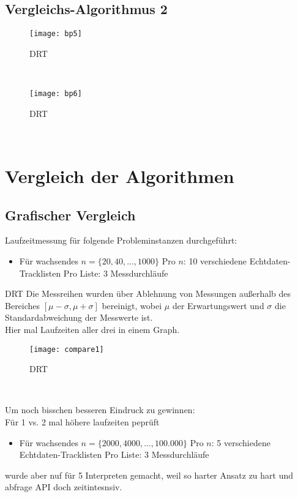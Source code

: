 \documentclass[
10pt, %
a4paper, %
oneside, %
headinclude,footinclude, %
BCOR5mm, %
]{scrartcl}
\begin{document}
\subsection{Vergleichs-Algorithmus 2}


\begin{figure}[h!]
	\centering 
	\texttt{[image: bp5]} 
	\caption[DRT]{DRT}
\end{figure}\
\begin{figure}[h!]
	\centering 
	\texttt{[image: bp6]} 
	\caption[DRT]{DRT}
\end{figure}\

\section{Vergleich der Algorithmen}
\subsection{Grafischer Vergleich}

Laufzeitmessung für folgende Probleminstanzen durchgeführt:
\begin{itemize}[noitemsep]
	\item Für wachsendes  \(n = \{20,40,...,1000\}\)
	\subitem Pro \(n\): 10 verschiedene Echtdaten-Tracklisten
	\subsubitem Pro Liste: 3 Messdurchläufe
\end{itemize}

DRT
Die Messreihen wurden über Ablehnung von Messungen außerhalb des Bereiches \([\mu-\sigma,\mu+\sigma]\) bereinigt, wobei \(\mu\) der Erwartungswert und \(\sigma\) die Standardabweichung der Messwerte ist.\\

Hier mal Laufzeiten aller drei in einem Graph.
\begin{figure}[h!]
	\centering 
	\texttt{[image: compare1]} 
	\caption[DRT]{DRT}
\end{figure}\


Um noch bisschen besseren Eindruck zu gewinnen:\\
Für 1 vs. 2 mal höhere laufzeiten peprüft
\begin{itemize}[noitemsep]
	\item Für wachsendes  \(n = \{2000,4000,...,100.000\}\)
	\subitem Pro \(n\): 5 verschiedene Echtdaten-Tracklisten
	\subsubitem Pro Liste: 3 Messdurchläufe
\end{itemize}

wurde aber nuf für 5 Interpreten gemacht, weil so harter Ansatz zu hart und abfrage API doch zeitintesnsiv.
\end{document}
